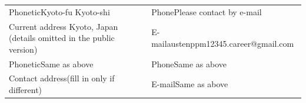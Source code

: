 \documentclass[a4paper,10pt]{article}
\newcommand{\fieldlabel}[1]{\small\textsf{#1}}
\begin{document}
\noindent
\begin{tabular}{|m{11.3cm}|m{5.9cm}|}
  \hline
  \fieldlabel{Phonetic}\hspace{1em}\footnotesize Kyoto-fu Kyoto-shi &
    \fieldlabel{Phone}\hspace{1em}Please contact by e-mail \\[-0.3em]
  \fieldlabel{Current address}\hspace{0.5em}
    Kyoto, Japan (details omitted in the public version) &
    \fieldlabel{E-mail}\hspace{0.5em}\small austenppm12345.career@gmail.com \\
  \hline
  \fieldlabel{Phonetic}\hspace{1em}Same as above &
    \fieldlabel{Phone}\hspace{1em}Same as above \\[-0.3em]
  \fieldlabel{Contact address}\hspace{0.5em}(fill in only if different) &
    \fieldlabel{E-mail}\hspace{0.5em}Same as above \\
  \hline
\end{tabular}

\vspace{4pt}
\end{document}
